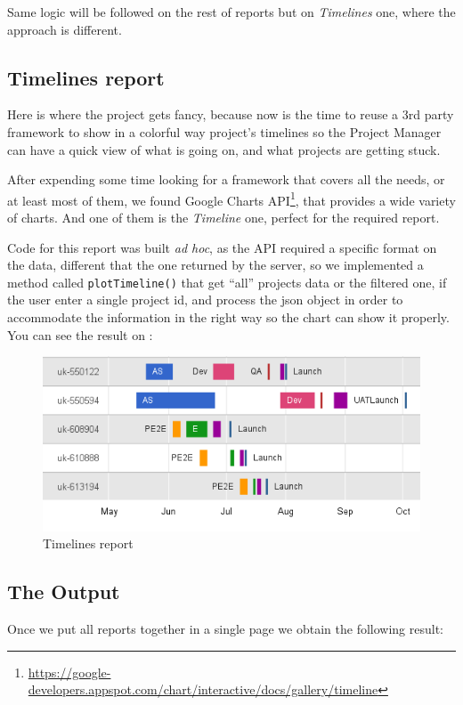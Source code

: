 Same logic will be followed on the rest of reports but on \emph{Timelines} one,
where the approach is different.

\subsection{Timelines report}
Here is where the project gets fancy, because now is the time to reuse a 3rd
party framework to show in a colorful way project's timelines so the Project
Manager can have a quick view of what is going on, and what projects are getting
stuck.

After expending some time looking for a framework that covers all the needs, or
at least most of them, we found Google Charts API\footnote{\url{https://google-developers.appspot.com/chart/interactive/docs/gallery/timeline}},
that provides a wide variety of charts. And one of them is the \emph{Timeline}
one, perfect for the required report.

Code for this report was built \emph{ad hoc}, as the API required a specific
format on the data, different that the one returned by the server, so we
implemented a method called \texttt{plotTimeline()} that get ``all'' projects data or the
filtered one, if the user enter a single project id, and process the json object
in order to accommodate the information in the right way so the chart can show
it properly. You can see the result on 
:

\begin{figure}[ht!]
	\centering
   	\includegraphics[width=1\textwidth]{./resources/report_timelines_new.png}
   	\caption{Timelines report}
   	\label{f_report_timelines_new}
\end{figure}

\subsection{The Output}
Once we put all reports together in a single page we obtain the following
result:


